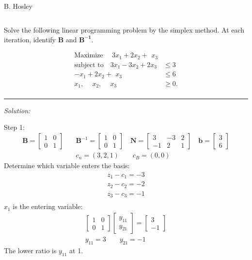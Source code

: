 \documentclass[12pt]{amsart}
\begin{document}
\raggedbottom

\hspace{\fill} {\large B. Hosley}
\bigskip


\setcounter{section}{3}
\setcounter{subsection}{4}
\subsection{}
Solve the following linear programming problem by the simplex method.
At each iteration, identify \(\mathbf{B}\) and \(\mathbf{B^{-1}}\).

\begin{align*}
	\text{Maximize } \quad 3x_1 + 2x_2 +\,\ x_3 & \\
	\text{subject to}\quad 3x_1 - 3x_2 + 2x_3 &\leq 3 \\
	-x_1 + 2x_2 +\,\ x_3 &\leq 6 \\
	x_1,\quad\ x_2,\quad\ x_3 &\geq 0. \\
\end{align*}

\hrule
\medskip
\textit{Solution:}

Step 1:
\begin{align*}
	\mathbf{B} = \begin{bmatrix} 1 & 0 \\ 0 & 1 \end{bmatrix} \quad &
	\mathbf{B}^{-1} = \begin{bmatrix} 1 & 0 \\ 0 & 1 \end{bmatrix} \quad
	\mathbf{N} = \begin{bmatrix} 3 & -3 & 2 \\ -1 & 2 & 1 \end{bmatrix} \quad
	\mathbf{b} = \begin{bmatrix} 3 \\ 6 \end{bmatrix} \\ &
	c_n = (3,2,1) \qquad
	c_B = (0,0)
\end{align*}
Determine which variable enters the basis:
\begin{align*}
	z_1 - c_1 = -3 \\
	z_2 - c_2 = -2 \\
	z_3 - c_3 = -1 \\
\end{align*}
\(x_1\) is the entering variable:
\begin{align*}
	\begin{bmatrix} 1 & 0 \\ 0 & 1 \end{bmatrix}
	\begin{bmatrix} y_{11} \\ y_{21} \end{bmatrix} =
	\begin{bmatrix} 3 \\ -1 \end{bmatrix} \\
	y_{11}=3 \qquad
	y_{21}=-1
\end{align*}
The lower ratio is \(y_{11}\) at 1.
\end{document}
